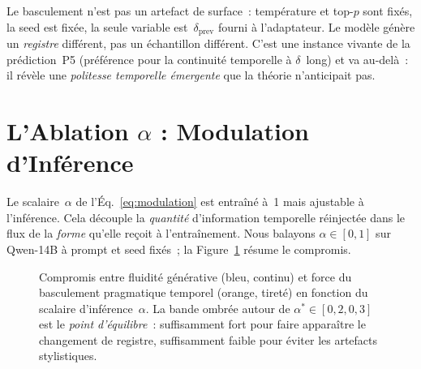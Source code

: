 \documentclass[10pt,twocolumn,letterpaper]{article}
\begin{document}
Le basculement n'est pas un artefact de surface~: température et top-$p$ sont fixés, la seed est fixée, la seule variable est~$\delta_{\text{prev}}$ fourni à l'adaptateur. Le modèle génère un \emph{registre} différent, pas un échantillon différent. C'est une instance vivante de la prédiction~P5 (préférence pour la continuité temporelle à $\delta$~long) et va au-delà~: il révèle une \emph{politesse temporelle émergente} que la théorie n'anticipait pas.

\section{L'Ablation $\alpha$ : Modulation d'Inférence}
\label{sec:alpha}

Le scalaire~$\alpha$ de l'Éq.~\ref{eq:modulation} est entraîné à~1 mais ajustable à l'inférence. Cela découple la \emph{quantité} d'information temporelle réinjectée dans le flux de la \emph{forme} qu'elle reçoit à l'entraînement. Nous balayons $\alpha \in [0, 1]$ sur Qwen-14B à prompt et seed fixés~; la Figure~\ref{fig:alpha} résume le compromis.

\begin{figure}[H]
\centering
{}
\caption{Compromis entre fluidité générative (bleu, continu) et force du basculement pragmatique temporel (orange, tireté) en fonction du scalaire d'inférence~$\alpha$. La bande ombrée autour de $\alpha^{*}\in[0{,}2,0{,}3]$ est le \emph{point d'équilibre}~: suffisamment fort pour faire apparaître le changement de registre, suffisamment faible pour éviter les artefacts stylistiques.}
\label{fig:alpha}
\end{figure}
\end{document}
